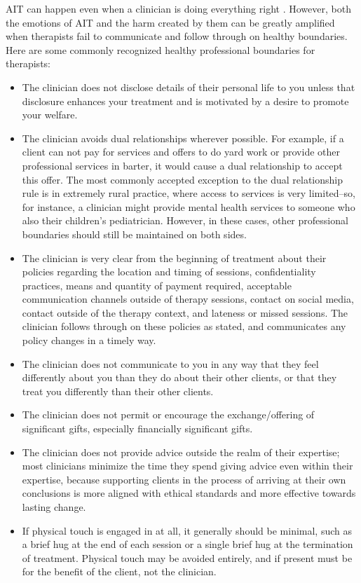 \documentclass[12pt,letterpaper]{book}
\begin{document}
AIT can happen even when a clinician is doing everything right \cite{transferranceLoveHarm}. However, both the emotions of AIT and the harm created by them can be greatly amplified when therapists fail to communicate and follow through on healthy boundaries. Here are some commonly recognized healthy professional boundaries for therapists:
\begin{itemize}
    \item The clinician does not disclose details of their personal life to you unless that disclosure enhances your treatment and is motivated by a desire to promote your welfare.
    \item The clinician avoids dual relationships wherever possible. For example, if a client can not pay for services and offers to do yard work or provide other professional services in barter, it would cause a dual relationship to accept this offer. The most commonly accepted exception to the dual relationship rule is in extremely rural practice, where access to services is very limited--so, for instance, a clinician might provide mental health services to someone who also their children's pediatrician.  However, in these cases, other professional boundaries should still be maintained on both sides.
    \item The clinician is very clear from the beginning of treatment about their policies regarding the location and timing of sessions, confidentiality practices, means and quantity of payment required, acceptable communication channels outside of therapy sessions, contact on social media, contact outside of the therapy context, and lateness or missed sessions. The clinician follows through on these policies as stated, and communicates any policy changes in a timely way.
    \item The clinician does not communicate to you in any way that they feel differently about you than they do about their other clients, or that they treat you differently than their other clients.
    \item The clinician does not permit or encourage the exchange/offering of significant gifts, especially financially significant gifts.
    \item The clinician does not provide advice outside the realm of their expertise; most clinicians minimize the time they spend giving advice even within their expertise, because supporting clients in the process of arriving at their own conclusions is more aligned with ethical standards and more effective towards lasting change.
    \item If physical touch is engaged in at all, it generally should be minimal, such as a brief hug at the end of each session or a single brief hug at the termination of treatment. Physical touch may be avoided entirely, and if present must be for the benefit of the client, not the clinician.

\end{itemize}
\end{document}
